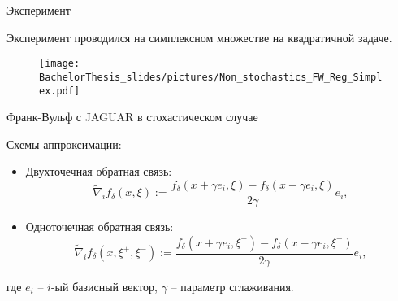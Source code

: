 \documentclass{beamer}
\begin{document}

\begin{frame}{Эксперимент}

    Эксперимент проводился на симплексном множестве на квадратичной задаче.

    \begin{figure}
        \centering
        \texttt{[image: BachelorThesis\_slides/pictures/Non\_stochastics\_FW\_Reg\_Simplex.pdf]}
    \end{figure}

\end{frame}


\begin{frame}{Франк-Вульф с JAGUAR в стохастическом случае}

    Схемы аппроксимации:

    \begin{itemize}
        \item Двухточечная обратная связь:
            \begin{equation*}
                \widetilde{\nabla}_if_\delta(x, \xi) :=  \dfrac{f_\delta(x + \gamma e_i, \xi) - f_\delta(x - \gamma e_i, \xi)}{2 \gamma} e_i,
            \end{equation*}
        \item Одноточечная обратная связь:
            \begin{equation*}
                \widetilde{\nabla}_if_\delta(x, \xi^+, \xi^-) :=  \dfrac{f_\delta(x + \gamma e_i, \xi^+) - f_\delta(x - \gamma e_i, \xi^-)}{2 \gamma} e_i,
            \end{equation*}
    \end{itemize}

    где $e_i$ -- $i$-ый базисный вектор, $\gamma$ -- параметр сглаживания.

\end{frame}

\end{document}

